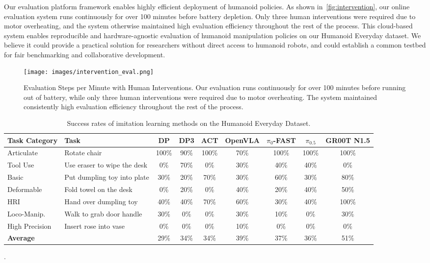 \documentclass[letterpaper, 10pt, conference]{ieeeconf}
\begin{document}
Our evaluation platform framework enables highly efficient deployment of humanoid policies. As shown in~\autoref{fig:intervention}, our online evaluation system runs continuously for over 100 minutes before battery depletion. Only three human interventions were required due to motor overheating, and the system otherwise maintained high evaluation efficiency throughout the rest of the process. This cloud-based system enables reproducible and hardware-agnostic evaluation of humanoid manipulation policies on our Humanoid Everyday dataset. We believe it could provide a practical solution for researchers without direct access to humanoid robots, and could establish a common testbed for fair benchmarking and collaborative development.\par
\begin{figure}[H]
  \centering
  \texttt{[image: images/intervention\_eval.png]}
  \caption{Evaluation Steps per Minute with Human Interventions. Our evaluation runs continuously for over 100 minutes before running out of battery, while only three human interventions were required due to motor overheating. The system maintained consistently high evaluation efficiency throughout the rest of the process.}
  \label{fig:intervention}
\end{figure}


\begin{table*}[!b]
  \centering
  \setlength{\tabcolsep}{8pt}
  \renewcommand{\arraystretch}{1.15}
  \begin{tabularx}{\textwidth}{X X c c c c c c c}
    \toprule
    \textbf{Task Category} & \textbf{Task} & \textbf{DP} & \textbf{DP3} & \textbf{ACT} & \textbf{OpenVLA} & \textbf{$\pi_{0}$-FAST} & \textbf{$\pi_{0.5}$} & \textbf{GR00T N1.5} \\
    \midrule
    Articulate & Rotate chair                      & 100\% & 90\% & 100\% & 70\% & 100\% & 100\% & 100\% \\
    Tool Use & Use eraser to wipe the desk           & 0\%    & 70\%   & 0\%    & 30\%    & 40\%    & 40\%   & 0\%\\
    Basic & Put dumpling toy into plate      & 30\% & 20\%   & 70\% & 30\% & 60\% & 30\% & 80\% \\
    Deformable & Fold towel on the desk           & 0\%    & 20\%   & 0\%    & 40\%    & 20\%    & 40\%  & 50\%\\
    HRI & Hand over dumpling toy             & 40\%    & 40\%   & 70\%    & 60\%    & 30\%    & 40\%  & 100\%\\
    Loco-Manip. & Walk to grab door handle             & 30\%   & 0\%   & 0\%    & 30\%    & 10\%    & 0\%  & 30\%\\
    High Precision & Insert rose into vase           & 0\%    & 0\%   & 0\%    & 10\%    & 0\%    & 0\%  & 0\%\\
    \midrule
    \textbf{Average} &  & 29\% & 34\% & 34\% & 39\% & 37\% & 36\% & 51\% \\
    \bottomrule
  \end{tabularx}
  \caption{Success rates of imitation learning methods on the Humanoid Everyday Dataset.}.
  \label{tab:experiments}
\end{table*}
\end{document}
